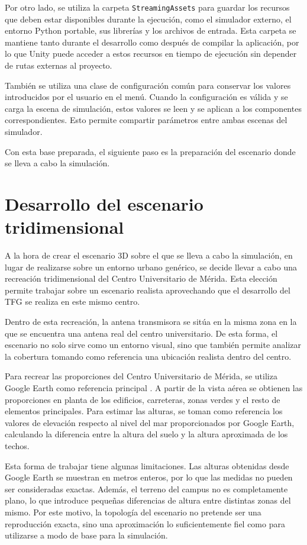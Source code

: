 Por otro lado, se utiliza la carpeta \texttt{StreamingAssets} para guardar los recursos que deben estar disponibles durante la ejecución, como el simulador externo, el entorno Python portable, sus librerías y los archivos de entrada. Esta carpeta se mantiene tanto durante el desarrollo como después de compilar la aplicación, por lo que Unity puede acceder a estos recursos en tiempo de ejecución sin depender de rutas externas al proyecto.

También se utiliza una clase de configuración común para conservar los valores introducidos por el usuario en el menú. Cuando la configuración es válida y se carga la escena de simulación, estos valores se leen y se aplican a los componentes correspondientes. Esto permite compartir parámetros entre ambas escenas del simulador.

Con esta base preparada, el siguiente paso es la preparación del escenario donde se lleva a cabo la simulación.

\section{Desarrollo del escenario tridimensional}

A la hora de crear el escenario 3D sobre el que se lleva a cabo la simulación, en lugar de realizarse sobre un entorno urbano genérico, se decide llevar a cabo una recreación tridimensional del Centro Universitario de Mérida. Esta elección permite trabajar sobre un escenario realista aprovechando que el desarrollo del TFG se realiza en este mismo centro.

Dentro de esta recreación, la antena transmisora se sitúa en la misma zona en la que se encuentra una antena real del centro universitario. De esta forma, el escenario no solo sirve como un entorno visual, sino que también permite analizar la cobertura tomando como referencia una ubicación realista dentro del centro.

Para recrear las proporciones del Centro Universitario de Mérida, se utiliza Google Earth como referencia principal \cite{googleearth}. A partir de la vista aérea se obtienen las proporciones en planta de los edificios, carreteras, zonas verdes y el resto de elementos principales. Para estimar las alturas, se toman como referencia los valores de elevación respecto al nivel del mar proporcionados por Google Earth, calculando la diferencia entre la altura del suelo y la altura aproximada de los techos.

Esta forma de trabajar tiene algunas limitaciones. Las alturas obtenidas desde Google Earth se muestran en metros enteros, por lo que las medidas no pueden ser consideradas exactas. Además, el terreno del campus no es completamente plano, lo que introduce pequeñas diferencias de altura entre distintas zonas del mismo. Por este motivo, la topología del escenario no pretende ser una reproducción exacta, sino una aproximación lo suficientemente fiel como para utilizarse a modo de base para la simulación.

